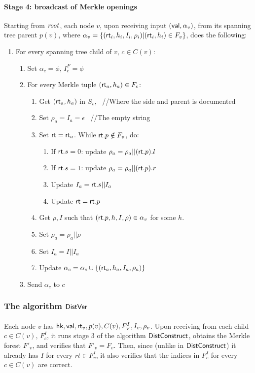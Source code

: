 \paragraph{Stage 4: broadcast of Merkle openings}
Starting from $\mathit{ root }$, each node $v$, upon receiving input $(\mathsf{val}, \alpha_v)$, from its spanning tree parent $p(v)$, where $\alpha_v = \{(\mathsf{rt}_i, h_i, I_i, \rho_i)| (\mathsf{rt}_i, h_i) \in F_v\}$, does the following:
\begin{enumerate}
    \item For every spanning tree child of $v$, $c\in C(v)$:
    \begin{enumerate}
        \item Set $\alpha_c = \phi$, $I^F_c = \phi$
        \item For every Merkle tuple $(\mathsf{rt}_a, h_a)\in F_c$:
        \begin{enumerate}
            \item Get $(\mathsf{rt}_a, h_a)$ in $S_v$, \ //Where the side and parent is documented
            \item Set $\rho_a = I_a = \epsilon$ \ //The empty string
            \item Set $\mathsf{rt} = \mathsf{rt}_a$. While $\mathsf{rt}.p \notin F_v$, do:
            \begin{enumerate}
                \item If $\mathsf{rt}.s = 0$: update $\rho_a = \rho_a || (\mathsf{rt}.p).l$
                \item If $\mathsf{rt}.s = 1$: update $\rho_a = \rho_a || (\mathsf{rt}.p).r$
                \item Update $I_a = \mathsf{rt}.s || I_a$
                \item Update $\mathsf{rt} = \mathsf{rt}.p$
            \end{enumerate}
            \item Get $\rho, I$ such that $(\mathsf{rt}.p, h, I, \rho)\in \alpha_v$ for some $h$.
            \item Set $\rho_a = \rho_a || \rho$
            \item Set $I_a = I || I_a$
            \item Update $\alpha_c = \alpha_c \cup \{(\mathsf{rt}_a, h_a, I_a, \rho_a)\}$
        \end{enumerate}
        \item Send $\alpha_c$ to $c$
    \end{enumerate}
\end{enumerate}

\subsubsection{The algorithm $\mathsf{DistVer}$}

\paragraph{}
Each node $v$ has $\mathsf{hk}, \mathsf{val}, \mathsf{rt}_v, p(v), C(v), F^I_V, I_v, \rho_v$. Upon receiving from each child $c\in C(v)$, $F^I_c$, it runs stage 3 of the algorithm $\mathsf{DistConstruct}$, obtains the Merkle forest $F'_v$, and verifies that $F'_v = F_v$. Then, since (unlike in $\mathsf{DistConstruct}$) it already has $I$ for every $rt\in F^I_v$, it also verifies that the indices in $F^I_c$ for every $c\in C(v)$ are correct.